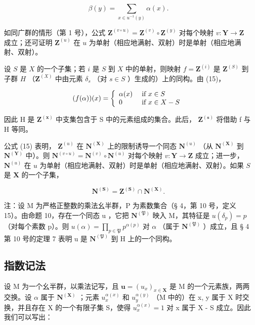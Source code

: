 \[
\beta (y) = \sum_ {x \in u ^ {- 1} (y)} \alpha (x).\tag{15}
\]

如同广群的情形（第 1 号），公式 \(\mathbf{Z}^{(v\circ u)} = \mathbf{Z}^{(v)}\circ \mathbf{Z}^{(y)}\) 对每个映射 \(v\colon \mathbf{Y}\to \mathbf{Z}\) 成立；还可证明 \(\mathbf{Z}^{(u)}\) 在 \(u\) 为单射（相应地满射、双射）时是单射（相应地满射、双射）。

设 \(S\) 是 \(X\) 的一个子集；若 \(i\) 是 \(S\) 到 \(X\) 中的单射，则映射 \(f = \mathbf{Z}^{(i)}\) 是 \(\mathbf{Z}^{(S)}\) 到子群 \(H\) （\(\mathbf{Z}^{(X)}\) 中由元素 \(\delta_s\) （对 \(s \in S\) ）生成的）上的同构。由 (15)，

\[
(f (\alpha)) (x) = \left\{ \begin{array}{l l} \alpha (x) & \text { if } x \in S \\ 0 & \text { if } x \in X - S \end{array} \right.
\]

因此 H 是 \(\mathbf{Z}^{(\mathbf{x})}\) 中支集包含于 S 中的元素组成的集合。此后， \(\mathbf{Z}^{(\mathbf{s})}\) 将借助 f 与 H 等同。

公式 (15) 表明， \(\mathbf{Z}^{(u)}\) 在 \(\mathbf{N}^{(\mathbf{X})}\) 上的限制诱导一个同态 \(\mathbf{N}^{(u)}\) （从 \(\mathbf{N}^{(\mathbf{X})}\) 到 \(\mathbf{N}^{(\mathbf{Y})}\) 中）。则 \(\mathbf{N}^{(v\circ u)} = \mathbf{N}^{(v)}\circ \mathbf{N}^{(u)}\) 对每个映射 \(v\colon \mathbf{Y}\to \mathbf{Z}\) 成立；进一步， \(\mathbf{N}^{(u)}\) 在 \(u\) 为单射（相应地满射、双射）时是单射（相应地满射、双射）。如果 \(S\) 是 \(\mathbf{X}\) 的一个子集，

\[
\mathbf {N} ^ {(\mathbf {S})} = \mathbf {Z} ^ {(\mathbf {S})} \cap \mathbf {N} ^ {(\mathbf {X})}.
\]

注：设 M 为严格正整数的乘法幺半群，P 为素数集合（§ 4，第 10 号，定义 15）。由命题 10，存在一个同态 u ，它把 \(\mathbf{N}^{(\mathfrak{P})}\) 映入 M，其特征是 \(u(\delta_{p}) = p\) （对每个素数 p）。则 \(u(\alpha) = \prod_{p \in \mathfrak{P}} p^{\alpha(p)}\) 对 \(\alpha\) （属于 \(\mathbf{N}^{(\mathfrak{P})}\) ）成立，且 § 4 第 10 号的定理 7 表明 u 是 \(\mathbf{N}^{(\mathfrak{P})}\) 到 H 上的一个同构。

\subsection{指数记法}

设 M 为一个幺半群，以乘法记写，且 \(\mathbf{u} = (u_{x})_{x \in \mathbf{X}}\) 是 M 的一个元素族，两两交换。设 \(\alpha\) 属于 \(\mathbf{N}^{(\mathbf{X})}\) ；元素 \(u_{x}^{\alpha(x)}\) 和 \(u_{y}^{\alpha(y)}\) （M 中的）在 x, y 属于 X 时交换，并且存在 X 的一个有限子集 S，使得 \(u_{x}^{\alpha(x)} = 1\) 对 x 属于 X - S 成立。因此我们可以写出：

